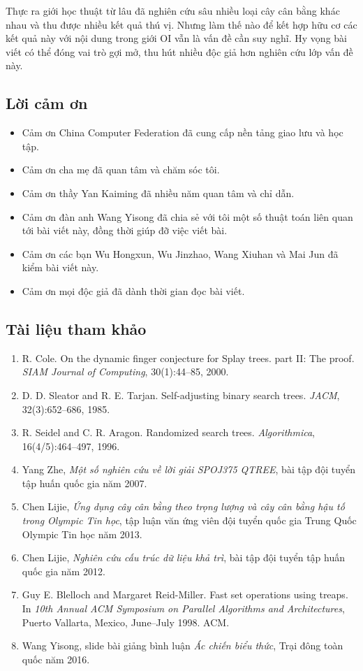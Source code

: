 \documentclass[11pt]{article}
\begin{document}
Thực ra giới học thuật từ lâu đã nghiên cứu sâu nhiều loại cây cân bằng khác
nhau và thu được nhiều kết quả thú vị. Nhưng làm thế nào để kết hợp hữu cơ các
kết quả này với nội dung trong giới OI vẫn là vấn đề cần suy nghĩ. Hy vọng bài
viết có thể đóng vai trò gợi mở, thu hút nhiều độc giả hơn nghiên cứu lớp vấn
đề này.

\subsection*{Lời cảm ơn}

\begin{itemize}
  \item Cảm ơn China Computer Federation đã cung cấp nền tảng giao lưu và học
  tập.
  \item Cảm ơn cha mẹ đã quan tâm và chăm sóc tôi.
  \item Cảm ơn thầy Yan Kaiming đã nhiều năm quan tâm và chỉ dẫn.
  \item Cảm ơn đàn anh Wang Yisong đã chia sẻ với tôi một số thuật toán liên
  quan tới bài viết này, đồng thời giúp đỡ việc viết bài.
  \item Cảm ơn các bạn Wu Hongxun, Wu Jinzhao, Wang Xiuhan và Mai Jun đã kiểm
  bài viết này.
  \item Cảm ơn mọi độc giả đã dành thời gian đọc bài viết.
\end{itemize}

\subsection*{Tài liệu tham khảo}

\begin{enumerate}
  \item R. Cole. On the dynamic finger conjecture for Splay trees. part II: The
  proof. \emph{SIAM Journal of Computing}, 30(1):44--85, 2000.
  \item D. D. Sleator and R. E. Tarjan. Self-adjusting binary search trees.
  \emph{JACM}, 32(3):652--686, 1985.
  \item R. Seidel and C. R. Aragon. Randomized search trees.
  \emph{Algorithmica}, 16(4/5):464--497, 1996.
  \item Yang Zhe, \emph{Một số nghiên cứu về lời giải SPOJ375 QTREE}, bài tập
  đội tuyển tập huấn quốc gia năm 2007.
  \item Chen Lijie, \emph{Ứng dụng cây cân bằng theo trọng lượng và cây cân
  bằng hậu tố trong Olympic Tin học}, tập luận văn ứng viên đội tuyển quốc gia
  Trung Quốc Olympic Tin học năm 2013.
  \item Chen Lijie, \emph{Nghiên cứu cấu trúc dữ liệu khả trì}, bài tập đội
  tuyển tập huấn quốc gia năm 2012.
  \item Guy E. Blelloch and Margaret Reid-Miller. Fast set operations using
  treaps. In \emph{10th Annual ACM Symposium on Parallel Algorithms and
  Architectures}, Puerto Vallarta, Mexico, June--July 1998. ACM.
  \item Wang Yisong, slide bài giảng bình luận \emph{Ác chiến biểu thức}, Trại
  đông toàn quốc năm 2016.
\end{enumerate}
\end{document}

